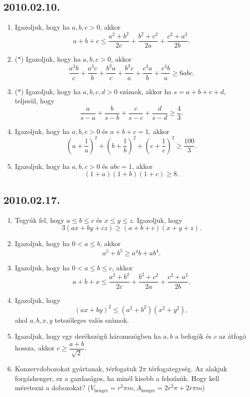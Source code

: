 \subsection*{2010.02.10.}
\begin{enumerate}
\item Igazoljuk, hogy ha $a,b,c>0$, akkor
$$a+b+c\le \dfrac{a^2+b^2}{2c}+\dfrac{b^2+c^2}{2a}+\dfrac{c^2+a^2}{2b}.$$
\item ($*$) Igazoljuk, hogy ha $a,b,c>0$, akkor
$$\dfrac{a^3b}{c}+\dfrac{a^3c}{b}+\dfrac{b^3a}{c}+\dfrac{b^3c}{a}
+\dfrac{c^3a}{b}+\dfrac{c^3b}{a}\ge 6abc. $$
\item ($*$) Igazoljuk, hogy ha $a,b,c,d>0$ számok, akkor
ha $s=a+b+c+d$, teljesül, hogy
$$\dfrac{a}{s-a}+\dfrac{b}{s-b}+\dfrac{c}{s-c}+\dfrac{d}{s-d}\ge \dfrac{4}{3}.$$
\item Igazoljuk, hogy ha $a,b,c>0$ és $a+b+c=1$, akkor
$$\left(a+\dfrac{1}{a}\right)^2+ 
\left(b+\dfrac{1}{b}\right)^2+
\left(c+\dfrac{1}{c}\right)^2\ge\dfrac{100}{3}.
$$
\item Igazoljuk, hogy ha $a,b,c>0$ és $abc=1$, akkor
$$(1+a)(1+b)(1+c)\ge 8.$$
\end{enumerate}

\subsection*{2010.02.17.}
\begin{enumerate}
\item Tegyük fel, hogy $a\le b \le c$ és $x\le y \le z$. Igazoljuk, hogy 
$$3(ax+by+cz)\ge(a+b+c)(x+y+z).$$
\item Igazoljuk, hogy ha $0<a\le b$, akkor
$$a^5+b^5\ge a^4b+ab^4.$$
\item Igazoljuk, hogy ha $0<a\le b\le c$, akkor
$$a+b+x\le \dfrac{a^2+b^2}{2c}+\dfrac{b^2+c^2}{2a}+\dfrac{c^2+a^2}{2b}.$$
\item Igazoljuk, hogy 
$$(ax+by)^2\le(a^2+b^2)(x^2+y^2),$$
ahol $a,b,x,y$ tetszőleges valós számok.
\item Igazoljuk, hogy egy derékszögű háromszögben ha $a,b$ a befogók és $c$ az átfogó hossza, akkor $c\ge\dfrac{a+b}{\sqrt{2}}$.
\item Konzervdobozokat gyártanak, térfogatuk $2\pi$ térfogategység.
Az alakjuk forgáshenger, ez a gazdaságos, ha minél kisebb a felszínük. Hogy kell méretezni a dobozokat? ($V_{\text{henger}}=r^2\pi m, A_{\text{henger}}=2r^2\pi+2r\pi m$)
\end{enumerate}


